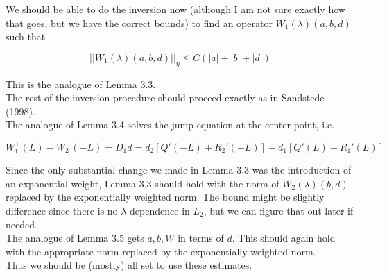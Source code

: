 \documentclass[12pt]{article}
\begin{document}
We should be able to do the inversion now (although I am not sure exactly how that goes, but we have the correct bounds) to find an operator $W_1(\lambda)(a, b, d)$ such that

\[
||W_1(\lambda)(a, b, d)||_\eta \leq C(|a| + |b| + |d|) 
\]

This is the analogue of Lemma 3.3. \\

The rest of the inversion procedure should proceed exactly as in Sandstede (1998). \\

The analogue of Lemma 3.4 solves the jump equation at the center point, i.e.

\[
W_1^+(L) - W_2^-(-L) = D_1 d = d_2 [ Q'(-L) + R_2'(-L)] - d_1 [ Q'(L) + R_1'(L) ]
\]

Since the only substantial change we made in Lemma 3.3 was the introduction of an exponential weight, Lemma 3.3 should hold with the norm of $W_2(\lambda)(b,d)$ replaced by the exponentially weighted norm. The bound might be slightly difference since there is no $\lambda$ dependence in $L_2$, but we can figure that out later if needed.\\

The analogue of Lemma 3.5 gets $a, b, W$ in terms of $d$. This should again hold with the appropriate norm replaced by the exponentially weighted norm.\\

Thus we should be (mostly) all set to use these estimates.
\end{document}
